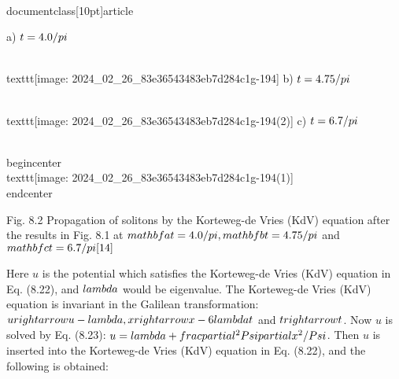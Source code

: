 \\documentclass[10pt]{article}
\begin{document}
{{{{{a) $t=4.0 / \\pi$

\\texttt{[image: 2024\_02\_26\_83e36543483eb7d284c1g-194]}
b) $t=4.75 / \\pi$

\\texttt{[image: 2024\_02\_26\_83e36543483eb7d284c1g-194(2)]}
c) $t=6.7 / \\pi$

\\begin{center}
\\texttt{[image: 2024\_02\_26\_83e36543483eb7d284c1g-194(1)]}
\\end{center}

Fig. 8.2 Propagation of solitons by the Korteweg-de Vries (KdV) equation after the results in Fig. 8.1 at $\\mathbf{a} t=4.0 / \\pi, \\mathbf{b} t=4.75 / \\pi$ and $\\mathbf{c} t=6.7 / \\pi[14]$

Here $u$ is the potential which satisfies the Korteweg-de Vries (KdV) equation in Eq. (8.22), and $\\lambda$ would be eigenvalue. The Korteweg-de Vries (KdV) equation is invariant in the Galilean transformation: $u \\rightarrow u-\\lambda, x \\rightarrow x-6 \\lambda t$ and $t \\rightarrow t$. Now $u$ is solved by Eq. (8.23): $u=\\lambda+\\frac{\\partial^{2} \\Psi}{\\partial x^{2}} / \\Psi$. Then $u$ is inserted into the Korteweg-de Vries (KdV) equation in Eq. (8.22), and the following is obtained:


}}}}}
\end{document}
